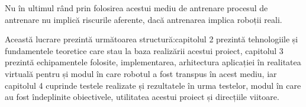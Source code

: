 Nu în ultimul rând prin folosirea acestui mediu de antrenare procesul de antrenare nu implică riscurile aferente, dacă antrenarea implica roboții reali.



Această lucrare prezintă următoarea structură:capitolul 2 prezintă tehnologiile și fundamentele teoretice care stau la baza realizării acestui proiect, capitolul 3 prezintă echipamentele folosite, implementarea, arhitectura aplicației în  realitatea virtuală pentru și modul în care robotul a fost transpus în acest mediu, iar capitolul 4 cuprinde testele realizate și rezultatele în urma testelor, modul în care au fost îndeplinite obiectivele, utilitatea acestui proiect și direcțiile viitoare.
     






